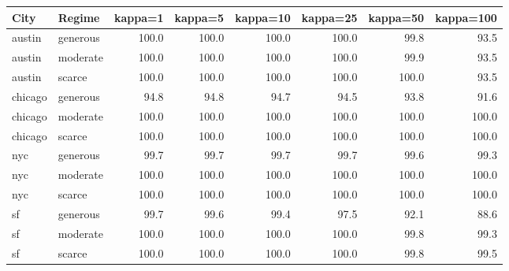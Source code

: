 \begin{tabular}{llrrrrrr}
\toprule
City & Regime & kappa=1 & kappa=5 & kappa=10 & kappa=25 & kappa=50 & kappa=100 \\
\midrule
austin & generous & 100.0 & 100.0 & 100.0 & 100.0 & 99.8 & 93.5 \\
austin & moderate & 100.0 & 100.0 & 100.0 & 100.0 & 99.9 & 93.5 \\
austin & scarce & 100.0 & 100.0 & 100.0 & 100.0 & 100.0 & 93.5 \\
chicago & generous & 94.8 & 94.8 & 94.7 & 94.5 & 93.8 & 91.6 \\
chicago & moderate & 100.0 & 100.0 & 100.0 & 100.0 & 100.0 & 100.0 \\
chicago & scarce & 100.0 & 100.0 & 100.0 & 100.0 & 100.0 & 100.0 \\
nyc & generous & 99.7 & 99.7 & 99.7 & 99.7 & 99.6 & 99.3 \\
nyc & moderate & 100.0 & 100.0 & 100.0 & 100.0 & 100.0 & 100.0 \\
nyc & scarce & 100.0 & 100.0 & 100.0 & 100.0 & 100.0 & 100.0 \\
sf & generous & 99.7 & 99.6 & 99.4 & 97.5 & 92.1 & 88.6 \\
sf & moderate & 100.0 & 100.0 & 100.0 & 100.0 & 99.8 & 99.3 \\
sf & scarce & 100.0 & 100.0 & 100.0 & 100.0 & 99.8 & 99.5 \\
\bottomrule
\end{tabular}
